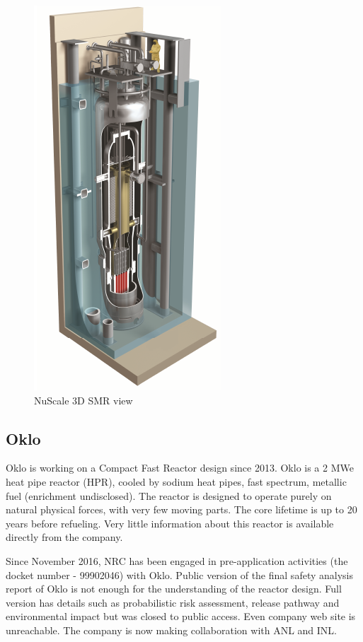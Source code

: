\begin{figure}[htbp]
\centering
\includegraphics[scale=0.8]{Figs/nuscale3d.jpeg}
\caption{NuScale 3D SMR view}
\label{Nu3d}
\end{figure}

\pagebreak
\subsection{Oklo}
Oklo is working on a Compact Fast Reactor design since 2013. Oklo  is a 2  MWe  heat  pipe  reactor  (HPR),  cooled  by  sodium  heat  pipes,  fast  spectrum,  metallic  fuel (enrichment undisclosed). The reactor is designed to operate purely on natural physical forces, with very few moving parts. The core lifetime is up to 20 years before refueling. Very little information about this reactor is available directly from the company.

Since November 2016, NRC has been engaged in pre-application activities (the docket number - 99902046) with Oklo. Public version of the final safety analysis report of Oklo \cite{oklo_inc._pilot_2018} is not enough for the understanding of the reactor design. Full version has details such as probabilistic risk assessment, release pathway and environmental impact but was closed to public access. Even company web site is unreachable. The company is now making collaboration with ANL and INL. 

